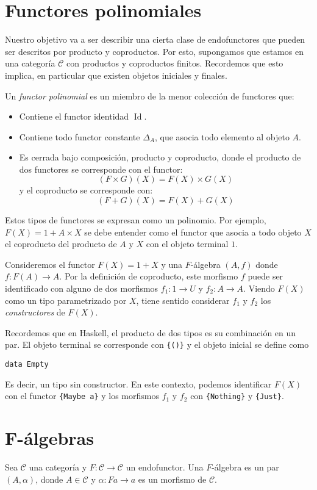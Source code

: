 \documentclass[12pt, twoside]{book}
\newcommand{\code}[1]{\Verb+{#1}+}
\newcommand{\cat}{{\mathcal{C}}}
\DeclareMathOperator{\Id}{Id}
\begin{document}
\section{Functores polinomiales}
Nuestro objetivo va a ser describir una cierta clase de endofunctores que pueden ser descritos por producto y coproductos.
Por esto, supongamos que estamos en una categoría $\cat$ con productos y coproductos finitos.
Recordemos que esto implica, en particular que existen objetos iniciales y finales.

\begin{definition}
Un \emph{functor polinomial} es un miembro de la menor colección de functores que:
\begin{itemize}
  \item Contiene el functor identidad $\Id$.
  \item Contiene todo functor constante $\Delta_A$, que asocia todo elemento al objeto $A$.
  \item Es cerrada bajo composición, producto y coproducto, donde el producto de dos functores se corresponde con el functor:
  \[ (F \times G)(X) = F(X) \times G(X)\]
  y el coproducto se corresponde con:
  \[ (F + G)(X) = F(X) + G(X) \]
\end{itemize}
\end{definition}
Estos tipos de functores se expresan como un polinomio.
Por ejemplo, $F(X) = 1 + A \times X$ se debe entender como el functor que asocia a todo objeto $X$ el coproducto del producto de $A$ y $X$ con el objeto terminal $1$.

Consideremos el functor $F(X) = 1 + X$ y una $F$-álgebra $(A,f)$ donde $f \colon F(A) \to A$.
Por la definición de coproducto, este morfismo $f$ puede ser identificado con alguno de dos morfismos $f_1 \colon 1 \to U$ y $f_2 \colon A \to A$.
Viendo $F(X)$ como un tipo parametrizado por $X$, tiene sentido considerar $f_1$ y $f_2$ los \emph{constructores} de $F(X)$.

Recordemos que en Haskell, el producto de dos tipos es su combinación en un par.
El objeto terminal se corresponde con \code{()} y el objeto inicial se define como
\begin{verbatim}
data Empty
\end{verbatim}
Es decir, un tipo sin constructor.
En este contexto, podemos identificar $F(X)$ con el functor \code{Maybe a} y los morfismos $f_1$ y $f_2$ con \code{Nothing} y \code{Just}.

\section{F-álgebras}
\begin{definition}
Sea $\cat$ una categoría y $F \colon \cat \to \cat$ un endofunctor.
Una $F$-álgebra es un par $(A,\alpha)$, donde $A \in \cat$ y $\alpha \colon F a \to a$ es un morfismo de $\cat$.
\end{definition}
\end{document}
